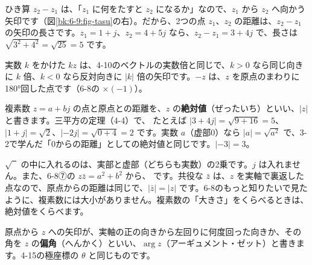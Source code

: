 ひき算 $z_2-z_1$ は、「$z_1$ に何をたすと $z_2$ になるか」なので、$z_1$ から $z_2$ へ向かう矢印です（図\ref{bk:6-9:fig-tasu}の右）。だから、2つの点 $z_1$、$z_2$ の距離は、$z_2-z_1$ の矢印の長さです。$z_1=1+j$、$z_2=4+5j$ なら、$z_2-z_1=3+4j$ で、長さは $\sqrt{3^2+4^2}=\sqrt{25}=5$ です。

実数 $k$ をかけた $kz$ は、4-10のベクトルの実数倍と同じで、$k>0$ なら同じ向きに $k$ 倍、$k<0$ なら反対向きに $|k|$ 倍の矢印です。$-z$ は、$z$ を原点のまわりに180°回した点です（6-8の $\times(-1)$）。


\leavevmode\label{bk:6-9:zettai}複素数 $z=a+bj$ の点と原点との距離を、$z$ の\textbf{絶対値}（ぜったいち）といい、$|z|$ と書きます。三平方の定理（4-4）で、
たとえば $|3+4j|=\sqrt{9+16}=5$、$|1+j|=\sqrt2$、$|-2j|=\sqrt{0+4}=2$ です。実数 $a$（虚部0）なら $|a|=\sqrt{a^2}$ で、3-2で学んだ「0からの距離」としての絶対値と同じです。$|-3|=3$。

$\sqrt{\phantom{2}}$ の中に入れるのは、実部と虚部（どちらも実数）の2乗です。$j$ は入れません。また、6-8⑦の $z\bar z=a^2+b^2$ から、
です。共役な $\bar z$ は、$z$ を実軸で裏返した点なので、原点からの距離は同じで、$|\bar z|=|z|$ です。6-8のもっと知りたいで見たように、複素数には大小がありません。複素数の「大きさ」をくらべるときは、絶対値をくらべます。


\leavevmode\label{bk:6-9:kyoku}原点から $z$ への矢印が、実軸の正の向きから左回りに何度回った向きか、その角を $z$ の\textbf{偏角}（へんかく）といい、$\arg z$（アーギュメント・ゼット）と書きます。4-15の極座標の $\theta$ と同じものです。

